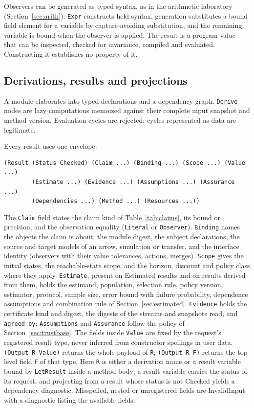 \documentclass[11pt]{article}
\newcommand{\code}[1]{\texttt{#1}}
\theoremstyle{definition}
\theoremstyle{plain}
\begin{document}
Observers can be generated as typed syntax, as in the arithmetic laboratory
(Section~\ref{sec:arith}): \code{Expr} constructs held syntax, generation substitutes a bound field
element for a variable by capture-avoiding substitution, and the remaining variable is bound when
the observer is applied. The result is a program value that can be inspected, checked for
invariance, compiled and evaluated. Constructing it establishes no property of it.

\subsection{Derivations, results and projections}

A module elaborates into typed declarations and a dependency graph. \code{Derive} nodes are lazy
computations memoized against their complete input snapshot and method version. Evaluation cycles
are rejected; cycles represented as data are legitimate.

Every result uses one envelope:
\begin{lstlisting}
(Result (Status Checked) (Claim ...) (Binding ...) (Scope ...) (Value ...)
        (Estimate ...) (Evidence ...) (Assumptions ...) (Assurance ...)
        (Dependencies ...) (Method ...) (Resources ...))
\end{lstlisting}
The \code{Claim} field states the claim kind of Table~\ref{tab:claims}, its bound or precision, and
the observation equality (\code{Literal} or \code{Observer}). \code{Binding} names the objects the
claim is about: the module digest, the subject declarations, the source and target models of an
arrow, simulation or transfer, and the interface identity (observers with their value tolerances,
actions, merges). \code{Scope} gives the initial states, the reachable-state scope, and the horizon,
discount and policy class where they apply. \code{Estimate}, present on Estimated results and on
results derived from them, holds the estimand, population, selection rule, policy version,
estimator, protocol, sample size, error bound with failure probability, dependence assumptions and
combination rule of Section~\ref{sec:estimated}. \code{Evidence} holds the certificate kind and
digest, the digests of the streams and snapshots read, and \code{agreed\_by}; \code{Assumptions} and
\code{Assurance} follow the policy of Section~\ref{sec:trustbase}. The fields
inside \code{Value} are fixed by the request's registered result type, never inferred from
constructor spellings in user data. \code{(Output R Value)} returns the whole payload of \code{R};
\code{(Output R F)} returns the top-level field \code{F} of that type. Here \code{R} is either a
derivation name or a result variable bound by \code{LetResult} inside a method body; a result
variable carries the status of its request, and projecting from a result whose status is not
Checked yields a dependency diagnostic. Misspelled, nested or unregistered fields are InvalidInput
with a diagnostic listing the available fields.
\end{document}
